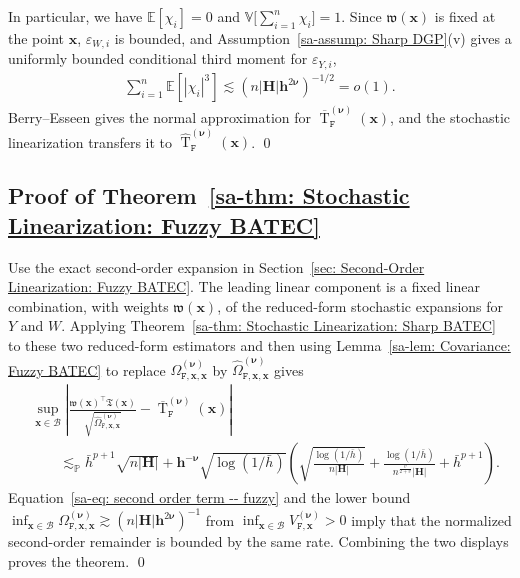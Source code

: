 \documentclass[10pt]{article}
\DeclareMathOperator{\Tstat}{T}
\newcommand{\E}{\mathbb{E}}
\newcommand{\Var}{\mathbb{V}}
\newcommand{\lessp}{\lesssim_{\mathbb{P}}}
\newcommand{\bh}{\mathbf{h}}
\newcommand{\bH}{\mathbf{H}}
\newcommand{\bx}{\mathbf{x}}
\newcommand{\bnu}{\boldsymbol{\nu}}
\newcommand{\B}{\mathcal{B}}
\begin{document}
In particular, we have $\E[\chi_i] = 0$ and $\Var\big[\sum_{i=1}^n \chi_i\big] = 1$. Since $\mathfrak w(\bx)$ is fixed at the point $\bx$, $\varepsilon_{W,i}$ is bounded, and Assumption~\ref{sa-assump: Sharp DGP}(v) gives a uniformly bounded conditional third moment for $\varepsilon_{Y,i}$,
\begin{align*}
    \sum_{i=1}^n\E[|\chi_i|^3]\lesssim (n|\bH|\bh^{2\bnu})^{-1/2}=o(1).
\end{align*}
Berry--Esseen gives the normal approximation for $\overline{\Tstat}_{\mathtt F}^{(\bnu)}(\bx)$, and the stochastic linearization transfers it to $\widehat{\Tstat}_{\mathtt F}^{(\bnu)}(\bx)$. \qed

\subsection{Proof of Theorem~\ref{sa-thm: Stochastic Linearization: Fuzzy BATEC}}
Use the exact second-order expansion in Section~\ref{sec: Second-Order Linearization: Fuzzy BATEC}. The leading linear component is a fixed linear combination, with weights $\mathfrak{w}(\bx)$, of the reduced-form stochastic expansions for $Y$ and $W$. Applying Theorem~\ref{sa-thm: Stochastic Linearization: Sharp BATEC} to these two reduced-form estimators and then using Lemma~\ref{sa-lem: Covariance: Fuzzy BATEC} to replace $\Omega_{\mathtt{F},\bx,\bx}^{(\bnu)}$ by $\widehat{\Omega}_{\mathtt{F},\bx,\bx}^{(\bnu)}$ gives
\begin{align*}
    &\sup_{\bx \in \B}
    \left|\frac{\mathfrak{w}(\bx)^\top\mathfrak{T}(\bx)}
    {\sqrt{\widehat{\Omega}_{\mathtt{F},\bx,\bx}^{(\bnu)}}}
    - \overline{\Tstat}^{(\bnu)}_{\mathtt{F}}(\bx)\right| \\
    &\qquad \lessp
    \bar{h}^{p+1}\sqrt{n |\bH|}
    + \bh^{-\bnu}\sqrt{\log(1/\bar{h})}
      \left(\sqrt{\frac{\log(1/\bar{h})}{n|\bH|}}
      +\frac{\log(1/\bar{h})}{n^{\frac{v}{2+v}}|\bH|}
      +\bar{h}^{p+1}\right).
\end{align*}
Equation~\eqref{sa-eq: second order term -- fuzzy} and the lower bound
$\inf_{\bx\in\B}\Omega_{\mathtt{F},\bx,\bx}^{(\bnu)}\gtrsim(n|\bH|\bh^{2\bnu})^{-1}$ from $\inf_{\bx\in\B}V_{\mathtt{F},\bx}^{(\bnu)}>0$ imply that the normalized second-order remainder is bounded by the same rate. Combining the two displays proves the theorem.
\qed

\end{document}
